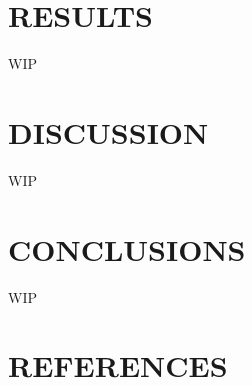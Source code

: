 \documentclass[conference]{IEEEtran}
\begin{document}






\section{RESULTS}\label{results}

WIP

\section{DISCUSSION}\label{discussion}

WIP

\section{CONCLUSIONS}\label{conclusions}

WIP

\section{REFERENCES}\label{references}
\end{document}
